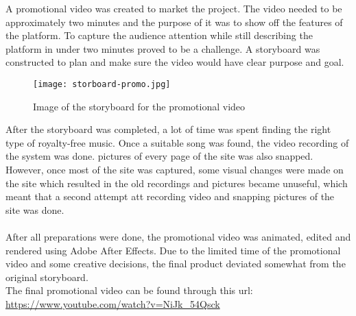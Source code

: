 A promotional video was created to market the project. The video needed to be approximately two minutes and the purpose of it was to show off the features of the platform.
To capture the audience attention while still describing the platform in under two minutes proved to be a challenge. A storyboard was constructed to plan and make sure the video would have clear purpose and goal.

\begin{figure}[h]
\texttt{[image: storboard-promo.jpg]}
\caption{Image of the storyboard for the promotional video}
\end{figure}

After the storyboard was completed, a lot of time was spent finding the right type of royalty-free music. Once a suitable song was found, the video recording of the system was done. pictures of every page of the site was also snapped. However, once most of the site was captured, some visual changes were made on the site which resulted in the old recordings and pictures became unuseful, which meant that a second attempt att recording video and snapping pictures of the site was done.\\
\\
After all preparations were done, the promotional video was animated, edited and rendered using Adobe After Effects.
Due to the limited time of the promotional video and some creative decisions, the final product deviated somewhat from the original storyboard.
\\
The final promotional video can be found through this url: \url{https://www.youtube.com/watch?v=NiJk_54Qsck}